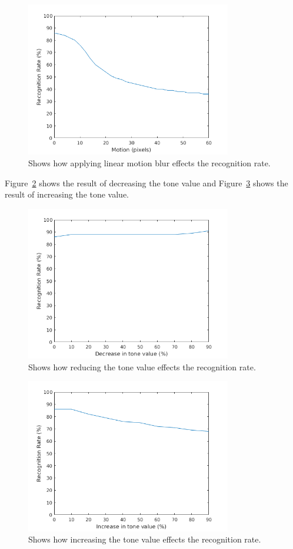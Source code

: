 \begin{figure}[H]
\centering
\includegraphics[width=0.8\textwidth]{img/blur_test/motion_plot.png}
\caption{Shows how applying linear motion blur effects the recognition rate.}
\label{fig:fr_result_plots_motion}
\end{figure}

Figure~\ref{fig:fr_result_plots_down} shows the result of decreasing the tone value and Figure~\ref{fig:fr_result_plots_up} shows the result of increasing the tone value.

\begin{figure}[H]
\centering
\includegraphics[width=0.8\textwidth]{img/blur_test/tone_down_plot.png}
\caption{Shows how reducing the tone value effects the recognition rate.}
\label{fig:fr_result_plots_down}
\end{figure}

\begin{figure}[H]
\centering
\includegraphics[width=0.8\textwidth]{img/blur_test/tone_up_plot.png}
\caption{Shows how increasing the tone value effects the recognition rate.}
\label{fig:fr_result_plots_up}
\end{figure}
